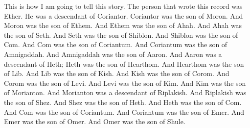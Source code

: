 This is how I am going to tell this story. The person that wrote this record was Ether. He was a descendant of Coriantor.
\bverse \iffalse Coriantor was the son of Moron. \fi
Coriantor was the son of Moron.
\bverse \iffalse And Moron was the son of Ethem. \fi
And Moron was the son of Ethem.
\bverse \iffalse And Ethem was the son of Ahah. \fi
And Ethem was the son of Ahah.
\bverse \iffalse And Ahah was the son of Seth. \fi
And Ahah was the son of Seth.
\bverse \iffalse And Seth was the son of Shiblon. \fi
And Seth was the son of Shiblon.
\bverse \iffalse And Shiblon was the son of Com. \fi
And Shiblon was the son of Com.
\bverse \iffalse And Com was the son of Coriantum. \fi
And Com was the son of Coriantum.
\bverse \iffalse And Coriantum was the son of Amnigaddah. \fi
And Coriantum was the son of Amnigaddah.
\bverse \iffalse And Amnigaddah was the son of Aaron. \fi
And Amnigaddah was the son of Aaron.
\bverse \iffalse And Aaron was a descendant of Heth, who was the son of Hearthom. \fi
And Aaron was a descendant of Heth; Heth was the son of Hearthom.
\bverse \iffalse And Hearthom was the son of Lib. \fi
And Hearthom was the son of Lib.
\bverse \iffalse And Lib was the son of Kish. \fi
And Lib was the son of Kish.
\bverse \iffalse And Kish was the son of Corom. \fi
And Kish was the son of Corom.
\bverse \iffalse And Corom was the son of Levi. \fi
And Corom was the son of Levi.
\bverse \iffalse And Levi was the son of Kim. \fi
And Levi was the son of Kim.
\bverse \iffalse And Kim was the son of Morianton. \fi
And Kim was the son of Morianton.
\bverse \iffalse And Morianton was a descendant of Riplakish. \fi
And Morianton was a descendant of Riplakish.
\bverse \iffalse And Riplakish was the son of Shez. \fi
And Riplakish was the son of Shez.
\bverse \iffalse And Shez was the son of Heth. \fi
And Shez was the son of Heth.
\bverse \iffalse And Heth was the son of Com. \fi
And Heth was the son of Com.
\bverse \iffalse And Com was the son of Coriantum. \fi
And Com was the son of Coriantum.
\bverse \iffalse And Coriantum was the son of Emer. \fi
And Coriantum was the son of Emer.
\bverse \iffalse And Emer was the son of Omer. \fi
And Emer was the son of Omer.
\bverse \iffalse And Omer was the son of Shule. \fi
And Omer was the son of Shule.
\bverse \iffalse And Shule was the son of Kib. \fi
